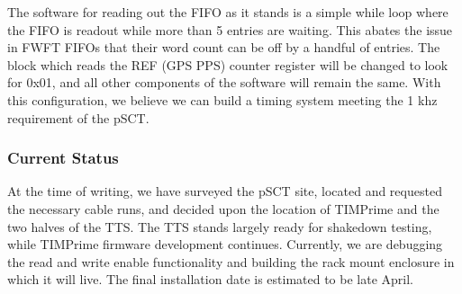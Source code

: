 The software for reading out the FIFO as it stands is a simple while loop where the FIFO is readout while more than 5 entries are waiting. This abates the issue in FWFT FIFOs that their word count can be off by a handful of entries. The block which reads the REF (GPS PPS) counter register will be changed to look for 0x01, and all other components of the software will remain the same. With this configuration, we believe we can build a timing system meeting the 1 khz requirement of the pSCT.

\subsubsection{Current Status}
At the time of writing, we have surveyed the pSCT site, located and requested the necessary cable runs, and decided upon the location of TIMPrime and the two halves of the TTS. The TTS stands largely ready for shakedown testing, while TIMPrime firmware development continues. Currently, we are debugging the read and write enable functionality and building the rack mount enclosure in which it will live. The final installation date is estimated to be late April.















